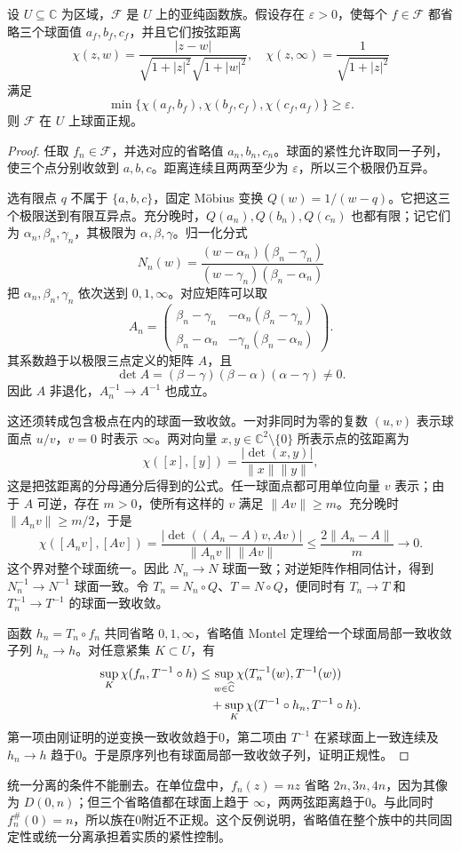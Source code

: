 \begin{proposition}[一致分离的变动省略值]\label{b3:prop:14-separated-omitted}
设 \(U\subseteq\mathbb C\) 为区域，\(\mathcal F\) 是 \(U\) 上的亚纯函数族。假设存在 \(\varepsilon>0\)，使每个 \(f\in\mathcal F\) 都省略三个球面值 \(a_f,b_f,c_f\)，并且它们按弦距离
\[
 \chi(z,w)=\frac{|z-w|}
 {\sqrt{1+|z|^2}\sqrt{1+|w|^2}},
 \quad \chi(z,\infty)=\frac1{\sqrt{1+|z|^2}}
\]
满足
\[
 \min\{\chi(a_f,b_f),\chi(b_f,c_f),\chi(c_f,a_f)\}
 \ge\varepsilon.
\]
则 \(\mathcal F\) 在 \(U\) 上球面正规。
\end{proposition}
\begin{proof}
任取 \(f_n\in\mathcal F\)，并选对应的省略值 \(a_n,b_n,c_n\)。球面的紧性允许取同一子列，使三个点分别收敛到 \(a,b,c\)。距离连续且两两至少为 \(\varepsilon\)，所以三个极限仍互异。

选有限点 \(q\) 不属于 \(\{a,b,c\}\)，固定 Möbius 变换 \(Q(w)=1/(w-q)\)。它把这三个极限送到有限互异点。充分晚时，\(Q(a_n),Q(b_n),Q(c_n)\) 也都有限；记它们为 \(\alpha_n,\beta_n,\gamma_n\)，其极限为 \(\alpha,\beta,\gamma\)。归一化分式
\[
 N_n(w)=
 \frac{(w-\alpha_n)(\beta_n-\gamma_n)}
      {(w-\gamma_n)(\beta_n-\alpha_n)}
\]
把 \(\alpha_n,\beta_n,\gamma_n\) 依次送到 \(0,1,\infty\)。对应矩阵可以取
\[
 A_n=
 \begin{pmatrix}
 \beta_n-\gamma_n&-\alpha_n(\beta_n-\gamma_n)\\
 \beta_n-\alpha_n&-\gamma_n(\beta_n-\alpha_n)
 \end{pmatrix}.
\]
其系数趋于以极限三点定义的矩阵 \(A\)，且
\[
 \det A=(\beta-\gamma)(\beta-\alpha)(\alpha-\gamma)\ne0.
\]
因此 \(A\) 非退化，\(A_n^{-1}\to A^{-1}\) 也成立。

这还须转成包含极点在内的球面一致收敛。一对非同时为零的复数 \((u,v)\) 表示球面点 \(u/v\)，\(v=0\) 时表示 \(\infty\)。两对向量 \(x,y\in\mathbb C^2\setminus\{0\}\) 所表示点的弦距离为
\[
 \chi([x],[y])=\frac{|\det(x,y)|}{\|x\|\|y\|},
\]
这是把弦距离的分母通分后得到的公式。任一球面点都可用单位向量 \(v\) 表示；由于 \(A\) 可逆，存在 \(m>0\)，使所有这样的 \(v\) 满足 \(\|Av\|\ge m\)。充分晚时 \(\|A_nv\|\ge m/2\)，于是
\[
 \chi([A_nv],[Av])
 =\frac{|\det((A_n-A)v,Av)|}{\|A_nv\|\|Av\|}
 \le\frac{2\|A_n-A\|}{m}\longrightarrow0.
\]
这个界对整个球面统一。因此 \(N_n\to N\) 球面一致；对逆矩阵作相同估计，得到 \(N_n^{-1}\to N^{-1}\) 球面一致。令 \(T_n=N_n\circ Q\)、\(T=N\circ Q\)，便同时有 \(T_n\to T\) 和 \(T_n^{-1}\to T^{-1}\) 的球面一致收敛。

函数 \(h_n=T_n\circ f_n\) 共同省略 \(0,1,\infty\)，省略值 Montel 定理给一个球面局部一致收敛子列 \(h_n\to h\)。对任意紧集 \(K\subset U\)，有
\[
 \begin{aligned}
 \sup_K\chi(f_n,T^{-1}\circ h)
 &\le
 \sup_{w\in\widehat{\mathbb C\kern0pt}}
       \chi(T_n^{-1}(w),T^{-1}(w))\\
 &\quad+\sup_K\chi(T^{-1}\circ h_n,T^{-1}\circ h).
 \end{aligned}
\]
第一项由刚证明的逆变换一致收敛趋于0，第二项由 \(T^{-1}\) 在紧球面上一致连续及 \(h_n\to h\) 趋于0。于是原序列也有球面局部一致收敛子列，证明正规性。
\end{proof}

统一分离的条件不能删去。在单位盘中，\(f_n(z)=nz\) 省略 \(2n,3n,4n\)，因为其像为 \(D(0,n)\)；但三个省略值都在球面上趋于 \(\infty\)，两两弦距离趋于0。与此同时 \(f_n^\#(0)=n\)，所以族在0附近不正规。这个反例说明，省略值在整个族中的共同固定性或统一分离承担着实质的紧性控制。
